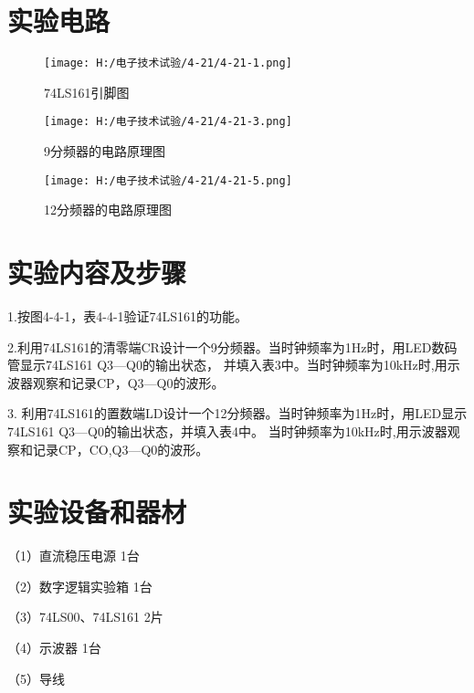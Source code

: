 \documentclass{article}
\begin{document}
\newpage
\section{ 实验电路}
\begin{figure}[h]
    \centering
    \texttt{[image: H:/电子技术试验/4-21/4-21-1.png]}
    \caption{74LS161引脚图} \label{fig:aa}
    \end{figure}
   
\begin{figure}[h]
    \centering
    \texttt{[image: H:/电子技术试验/4-21/4-21-3.png]}
    \caption{9分频器的电路原理图} \label{fig:aa}
    \end{figure}


    \begin{figure}[h]
        \centering
        \texttt{[image: H:/电子技术试验/4-21/4-21-5.png]}
        \caption{12分频器的电路原理图} \label{fig:aa}
        \end{figure}

\newpage

\section{ 实验内容及步骤}
1.按图4-4-1，表4-4-1验证74LS161的功能。\par
2.利用74LS161的清零端CR设计一个9分频器。当时钟频率为1Hz时，用LED数码管显示74LS161 Q3—Q0的输出状态，
并填入表3中。当时钟频率为10kHz时,用示波器观察和记录CP，Q3—Q0的波形。\par
3. 利用74LS161的置数端LD设计一个12分频器。当时钟频率为1Hz时，用LED显示74LS161 Q3—Q0的输出状态，并填入表4中。
当时钟频率为10kHz时,用示波器观察和记录CP，CO,Q3—Q0的波形。\par



\section{ 实验设备和器材}
（1）直流稳压电源             \qquad \quad \qquad \qquad \qquad \qquad           1台\par
（2）数字逻辑实验箱            \qquad  \qquad \qquad \qquad\qquad                1台\par
（3）74LS00、74LS161 \qquad    \quad                                    2片\par
（4）示波器 \qquad  \qquad \qquad \qquad\qquad  \qquad  \qquad    1台\par
 （5）导线   
\end{document}

